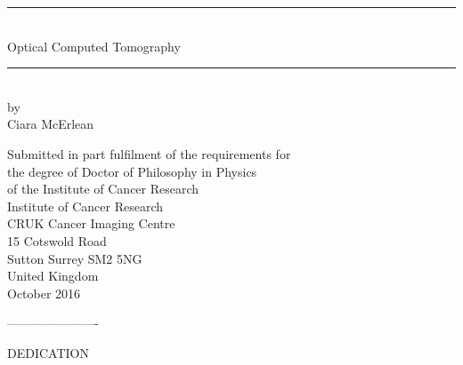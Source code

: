 \documentclass[11pt,oneside]{book}
\begin{document}
\singlespacing
\thispagestyle{plain}
\begin{center}
\vspace{-3.5cm}
\rule{\linewidth}{1mm}
\vspace{3mm}\\
{\fontsize{28}{28}\selectfont Optical Computed Tomography}
\vspace{5mm}\\
\rule{\linewidth}{1mm}
\vspace{3mm}\\
{\Large by \\
\vspace{0.2cm}
Ciara McErlean}

{\Large \vspace{2.5cm}
Submitted in part fulfilment of the requirements for   \\
\vspace{0.2cm}
the degree of Doctor of Philosophy in Physics  \\
\vspace{0.2cm}
of the Institute of Cancer Research
\vspace{4.2cm}\\
Institute  of Cancer Research\\
CRUK Cancer Imaging Centre\\
15 Cotswold Road\\
Sutton Surrey SM2 5NG\\
United Kingdom
\\
\vspace{1.5cm}
October 2016}
\end{center}

 ----------------------
\vspace*{4cm}
\thispagestyle{plain}
\begin{center}{DEDICATION}\end{center}

\onehalfspacing
\end{document}
